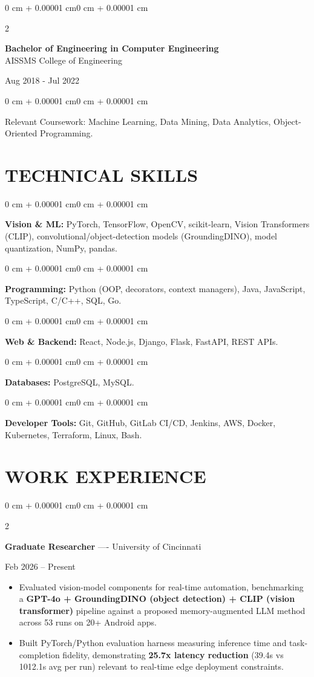 \documentclass[10pt, letterpaper]{article}
\newenvironment{highlights}{
    \begin{itemize}[
        topsep=0.10 cm,
        parsep=0.06 cm,
        partopsep=0pt,
        itemsep=0.06 cm,
        leftmargin=12pt
    ]
}{
    \end{itemize}
}
\newenvironment{onecolentry}{
    \begin{adjustwidth}{0 cm + 0.00001 cm}{0 cm + 0.00001 cm}
}{
    \end{adjustwidth}
}
\newenvironment{twocolentry}[2][]{
    \onecolentry
    \def\secondColumn{#2}
    \setcolumnwidth{\fill, 4.5 cm}
    \begin{paracol}{2}
}{
    \switchcolumn \raggedleft \secondColumn
    \end{paracol}
    \endonecolentry
}
\begin{document}
\begin{twocolentry}{
    Aug 2018 - Jul 2022
}
    \textbf{Bachelor of Engineering in Computer Engineering} \\
    AISSMS College of Engineering
\end{twocolentry}
\begin{onecolentry}
Relevant Coursework: Machine Learning, Data Mining, Data Analytics, Object-Oriented Programming.
\end{onecolentry}
\section{TECHNICAL SKILLS}
\begin{onecolentry}
\textbf{Vision \& ML:} PyTorch, TensorFlow, OpenCV, scikit-learn, Vision Transformers (CLIP), convolutional/object-detection models (GroundingDINO), model quantization, NumPy, pandas.
\end{onecolentry}
\vspace{0.06 cm}
\begin{onecolentry}
\textbf{Programming:} Python (OOP, decorators, context managers), Java, JavaScript, TypeScript, C/C++, SQL, Go.
\end{onecolentry}
\vspace{0.06 cm}
\begin{onecolentry}
\textbf{Web \& Backend:} React, Node.js, Django, Flask, FastAPI, REST APIs.
\end{onecolentry}
\vspace{0.06 cm}
\begin{onecolentry}
\textbf{Databases:} PostgreSQL, MySQL.
\end{onecolentry}
\vspace{0.06 cm}
\begin{onecolentry}
\textbf{Developer Tools:} Git, GitHub, GitLab CI/CD, Jenkins, AWS, Docker, Kubernetes, Terraform, Linux, Bash.
\end{onecolentry}

\section{WORK EXPERIENCE}
\begin{twocolentry}{Feb 2026 -- Present}
\textbf{Graduate Researcher} ---- University of Cincinnati
\end{twocolentry}
\begin{highlights}
  \item Evaluated vision-model components for real-time automation, benchmarking a \textbf{GPT-4o + GroundingDINO (object detection) + CLIP (vision transformer)} pipeline against a proposed memory-augmented LLM method across 53 runs on 20+ Android apps.
  \item Built PyTorch/Python evaluation harness measuring inference time and task-completion fidelity, demonstrating \textbf{25.7x latency reduction} (39.4s vs 1012.1s avg per run) relevant to real-time edge deployment constraints.
\end{highlights}
\end{document}
